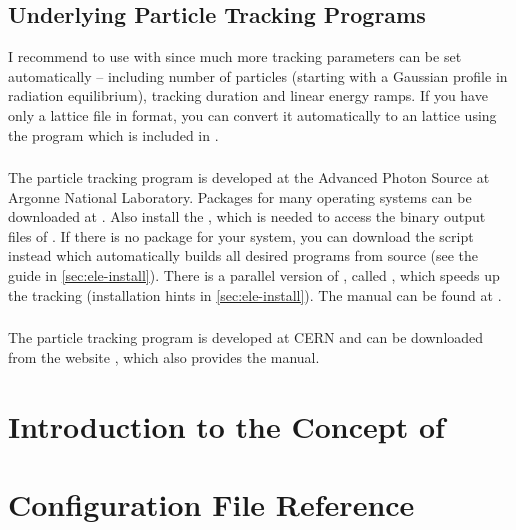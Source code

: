 \documentclass[a4paper]{scrartcl}
\begin{document}
\subsection{Underlying Particle Tracking Programs}
\label{sec:elemadx}

I recommend to use \polem with \ele since much more tracking parameters can be set
automatically -- including number of particles (starting with a Gaussian profile in
radiation equilibrium), tracking duration and linear energy ramps. If you have only a
lattice file in \madx format, you can convert it automatically to an \ele lattice
using the program  which is included in \pal \cite{palattice}.

\subsubsection{\ele}
\label{sec:ele}
The particle tracking program \ele \cite{elegant} is developed at the Advanced Photon
Source at Argonne National Laboratory. Packages for many operating systems can be
downloaded at \cite{elegant-download}. Also install the , which is
needed to access the binary output files of \ele.
%
If there is no package for your system, you can download the 
script instead which automatically builds all desired programs from source (see the guide
in \cref{sec:ele-install}).
%
There is a parallel version of \ele, called , which speeds up the
tracking \cite{pelegant} (installation hints in \cref{sec:ele-install}). The \ele manual
can be found at \cite{elegant-manual}.

\subsubsection{\madx}
\label{sec:madx}
The particle tracking program \madx is developed at CERN and can be downloaded from the
website \cite{madx}, which also provides the \madx manual.





\section{Introduction to the Concept of \polem}
\label{sec:concept}




\section{Configuration File Reference}
\label{sec:config}
\end{document}
